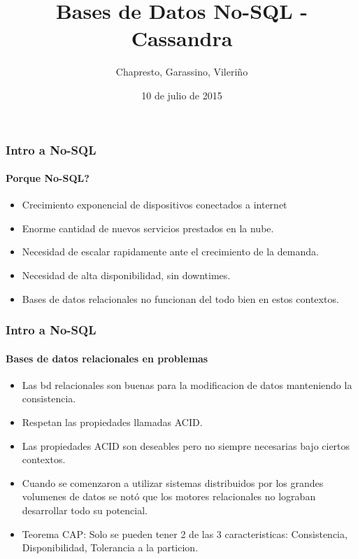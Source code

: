 \documentclass{beamer}
\title{Bases de Datos No-SQL - Cassandra}
\author{Chapresto, Garassino, Vileriño}
\date{10 de julio de 2015}
\begin{document}
\begin{frame}
  \maketitle
\end{frame}

\begin{frame}
  \frametitle{Intro a No-SQL}    
  \framesubtitle{Porque No-SQL?}
  \begin{itemize}
    \setlength{\itemsep}{3pt}
    \item Crecimiento exponencial de dispositivos conectados a internet
    \pause
    \item Enorme cantidad de nuevos servicios prestados en la nube.
    \pause
    \item Necesidad de escalar rapidamente ante el crecimiento de la demanda.
    \pause
    \item Necesidad de alta disponibilidad, sin downtimes.
    \pause
    \item Bases de datos relacionales no funcionan del todo bien en estos contextos.
  \end{itemize}
\end{frame}

\begin{frame}
  \frametitle{Intro a No-SQL}    
  \framesubtitle{Bases de datos relacionales en problemas}
  \begin{itemize}
    \setlength{\itemsep}{3pt}
    \item Las bd relacionales son buenas para la modificacion de datos manteniendo la consistencia. 
    \pause
    \item Respetan las propiedades llamadas ACID.
    \pause
    \item Las propiedades ACID son deseables pero no siempre necesarias bajo ciertos contextos.
    \pause
    \item Cuando se comenzaron a utilizar sistemas distribuidos por los grandes volumenes de datos se not\'o que los motores relacionales no lograban desarrollar todo su potencial.
    \pause
    \item Teorema CAP: Solo se pueden tener 2 de las 3 caracteristicas: Consistencia, Disponibilidad, Tolerancia a la particion. 
  \end{itemize}
\end{frame}
\end{document}

